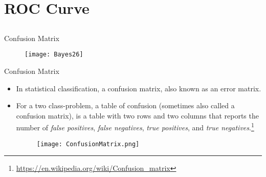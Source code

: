 %
%
%

\section{ROC Curve}
\subsection{}

\begin{frame}{Confusion Matrix}
\begin{figure}
\texttt{[image: Bayes26]}
\end{figure}
\end{frame}

\begin{frame}{Confusion Matrix}
\begin{itemize}
\item In statistical classification, a confusion matrix, also known as an error matrix.
\item For a two class-problem, a table of confusion (sometimes also called a confusion matrix), is a table with two rows and two columns that reports the number of \textit{\color{mycolor2}false positives}, \textit{\color{mycolor2} false negatives}, \textit{\color{mycolor2}true positives}, and \textit{\color{mycolor2}true negatives}.\footnote{\url{https://en.wikipedia.org/wiki/Confusion_matrix}}
\begin{figure}
\texttt{[image: ConfusionMatrix.png]}
\end{figure}
\end{itemize}
\end{frame}

